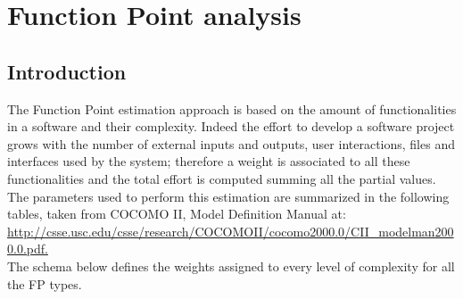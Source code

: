 \documentclass[a4paper,11pt]{report} %
\begin{document}
	\pagebreak		
	\section{Function Point analysis}
		\subsection{Introduction}
			The Function Point estimation approach is based on the amount of functionalities in a software and their complexity. Indeed the effort to develop a software project grows with the number of external inputs and outputs, user interactions, files and interfaces used by the system; therefore a weight is associated to all these functionalities and the total effort is computed summing all the partial values.\bigskip \\
			The parameters used to perform this estimation are summarized in the following tables, taken from COCOMO II, Model Definition Manual at:\smallskip\\ \href{http://csse.usc.edu/csse/research/COCOMOII/cocomo2000.0/CII\_modelman2000.0.pdf}{http://csse.usc.edu/csse/research/COCOMOII/cocomo2000.0/CII\_modelman2000.0.pdf.}\bigskip\\
			The schema below defines the weights assigned to every level of complexity for all the FP types.\smallskip\\
			\begin{minipage}{\linewidth}
			\end{minipage}
\end{document}
